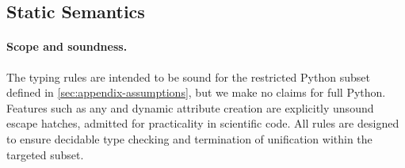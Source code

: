 \subsection{Static Semantics}
\label{subsec:static-semantics}

\paragraph{Scope and soundness.}
The typing rules are intended to be sound for the restricted Python subset
defined in \cref{sec:appendix-assumptions}, but we make no claims for full Python.
Features such as \textsf{any} and dynamic attribute creation are explicitly
unsound escape hatches, admitted for practicality in scientific code.  
All rules are designed to ensure decidable type checking and termination of unification within the targeted subset.

